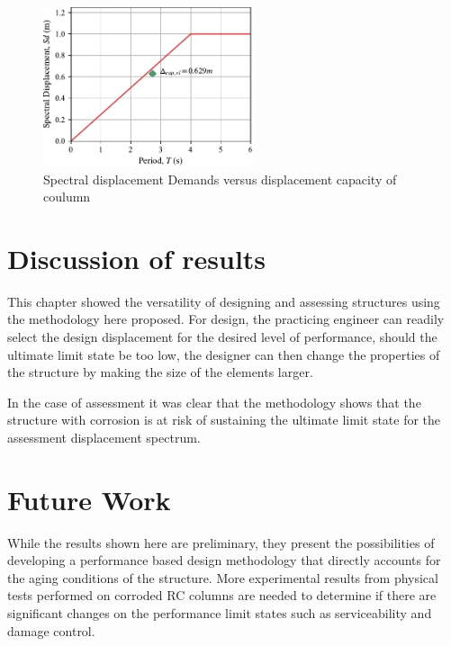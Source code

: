 \begin{figure}[htbp]
	\centering
	\includegraphics[width=0.55\textwidth]{VAC Thesis 2.0/Chapter-6/figs/SD_Assessment_9_75.pdf}
	\caption{Spectral displacement Demands versus displacement capacity of coulumn}
	\label{fig:force_displacement_assessment}
\end{figure}

\section{Discussion of results}

This chapter showed the versatility of designing and assessing structures using the methodology here proposed. For design, the practicing engineer can readily select the design displacement for the desired level of performance, should the ultimate limit state be too low, the designer can then change the properties of the structure by making the size of the elements larger. 

In the case of assessment it was clear that the methodology shows that the structure with corrosion is at risk of sustaining the ultimate limit state for the assessment displacement spectrum.

\section{Future Work}

While the results shown here are preliminary, they present the possibilities of developing a performance based design methodology that directly accounts for the aging conditions of the structure. More experimental results from physical tests performed on corroded RC columns are needed to determine if there are significant changes on the performance limit states such as serviceability and damage control.